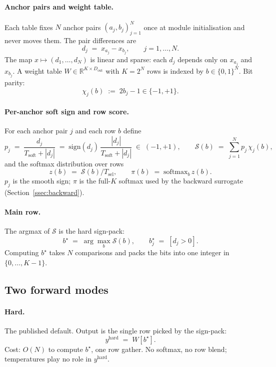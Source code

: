 \documentclass[11pt]{article}
\newcommand{\R}{\mathbb{R}}
\newcommand{\sign}{\mathrm{sign}}
\newcommand{\softmax}{\mathrm{softmax}}
\newcommand{\Tsel}{T_{\mathrm{sel}}}
\newcommand{\Tsoft}{T_{\mathrm{soft}}}
\newcommand{\dout}{D_{\mathrm{out}}}
\newcommand{\bstar}{b^{\star}}
\begin{document}
\paragraph{Anchor pairs and weight table.} Each table fixes $N$ anchor pairs $(a_j, b_j)_{j=1}^{N}$ once at module initialisation and never moves them. The pair differences are
\[
d_j \;=\; x_{a_j} - x_{b_j}, \qquad j = 1, \dots, N.
\]
The map $x \mapsto (d_1, \dots, d_N)$ is linear and sparse: each $d_j$ depends only on $x_{a_j}$ and $x_{b_j}$. A weight table $W \in \R^{K \times \dout}$ with $K = 2^{N}$ rows is indexed by $b \in \{0,1\}^{N}$. Bit parity:
\[
\chi_j(b) \;:=\; 2 b_j - 1 \in \{-1, +1\}.
\]

\paragraph{Per-anchor soft sign and row score.} For each anchor pair $j$ and each row $b$ define
\[
p_j \;=\; \frac{d_j}{\Tsoft + |d_j|} \;=\; \sign(d_j)\,\frac{|d_j|}{\Tsoft + |d_j|}\;\in\;(-1,+1),
\qquad
\mathcal{S}(b) \;=\; \sum_{j=1}^{N} p_j\, \chi_j(b),
\]
and the softmax distribution over rows
\[
z(b) \;=\; \mathcal{S}(b)/\Tsel,
\qquad \pi(b) \;=\; \softmax_b\,z(b).
\]
$p_j$ is the smooth sign; $\pi$ is the full-$K$ softmax used by the backward surrogate (Section~\ref{ssec:backward}).

\paragraph{Main row.} The argmax of $\mathcal{S}$ is the hard sign-pack:
\[
\bstar \;=\; \arg\max_{b} \mathcal{S}(b), \qquad \bstar_j \;=\; [d_j > 0].
\]
Computing $\bstar$ takes $N$ comparisons and packs the bits into one integer in $\{0,\dots,K-1\}$.

\subsection{Two forward modes}
\label{ssec:forward}

\paragraph{Hard.} The published default. Output is the single row picked by the sign-pack:
\[
\boxed{\;
y^{\text{hard}} \;=\; W[\bstar].
\;}
\]
Cost: $O(N)$ to compute $\bstar$, one row gather. No softmax, no row blend; temperatures play no role in $y^{\text{hard}}$.
\end{document}
